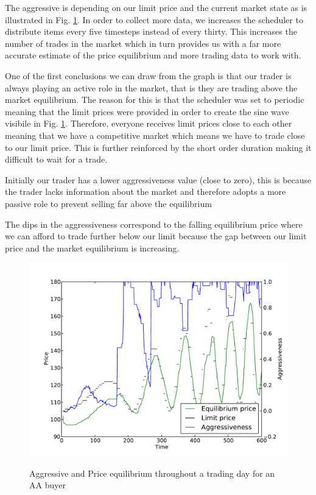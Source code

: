 \documentclass{acm_proc_article-sp}
\begin{document}
The aggressive is depending on our limit price and the current market state as
is illustrated in Fig. \ref{aavtime}. In order to collect more data, we
increases the scheduler to distribute items every five timesteps instead of
every thirty. This increases the number of trades in the market which in turn
provides us with a far more accurate estimate of the price equilibrium and more
trading data to work with.

One of the first conclusions we can draw from the graph is that our trader is
always playing an active role in the market, that is they are trading above the
market equilibrium. The reason for this is that the scheduler was set to
periodic meaning that the limit prices were provided in order to create the
sine wave visibile in Fig. \ref{aavtime}. Therefore, everyone receives limit
prices close to each other meaning that we have a competitive market which
means we have to trade close to our limit price. This is further reinforced by
the short order duration making it difficult to wait for a trade.

Initially our trader has a lower aggressiveness value (close to zero), this is
because the trader lacks information about the market and therefore adopts a
more passive role to prevent selling far above the equilibrium

The dips in the aggressiveness correspond to the falling equilibrium price
where we can afford to trade further below our limit because the gap between
our limit price and the market equilibrium is increasing.

\begin{figure} 
  \centering
  \includegraphics[width=\columnwidth]{graphs_and_stats/aggressiveness_vs_price.pdf}
  \label{aavtime}
  \caption{Aggressive and Price equilibrium throughout a trading day for an AA
  buyer}
\end{figure}
\end{document}
